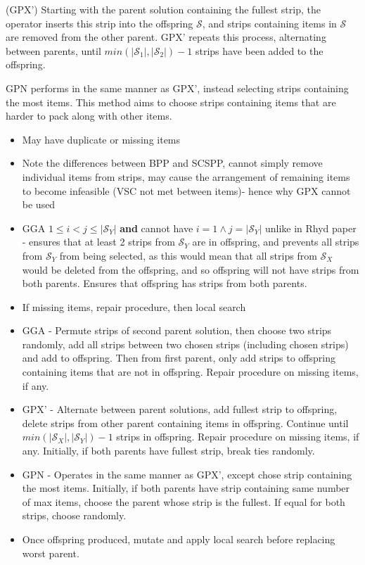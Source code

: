 \documentclass{elsarticle}
\begin{document}
(GPX') Starting with the parent solution containing the fullest strip, the operator inserts this strip into the offspring $\mathcal{S}$, and strips containing items in $\mathcal{S}$ are removed from the other parent. GPX' repeats this process, alternating between parents, until $min (|\mathcal{S}_1|,|\mathcal{S}_2|) - 1$ strips have been added to the offspring.

GPN performs in the same manner as GPX', instead selecting strips containing the most items. This method aims to choose strips containing items that are harder to pack along with other items.

\begin{itemize}
	\item May have duplicate or missing items
	\item Note the differences between BPP and SCSPP, cannot simply remove individual items from strips, may cause the arrangement of remaining items to become infeasible (VSC not met between items)- hence why GPX cannot be used \cite{lewis2017}
	\item GGA $1 \leq i < j \leq |\mathcal{S}_Y|$ \textbf{and} cannot have $i = 1 \land j = |\mathcal{S}_Y|$ unlike in Rhyd paper - ensures that at least 2 strips from $\mathcal{S}_Y$ are in offspring, and prevents all strips from $\mathcal{S}_Y$ from being selected, as this would mean that all strips from $\mathcal{S}_X$ would be deleted from the offspring, and so offspring will not have strips from both parents. Ensures that offspring has strips from both parents.
	\item If missing items, repair procedure, then local search
	\item GGA - Permute strips of second parent solution, then choose two strips randomly, add all strips between two chosen strips (including chosen strips) and add to offspring. Then from first parent, only add strips to offspring containing items that are not in offspring. Repair procedure on missing items, if any.
	\item GPX' - Alternate between parent solutions, add fullest strip to offspring, delete strips from other parent containing items in offspring. Continue until $min(|\mathcal{S}_X|,|\mathcal{S}_Y|)-1$ strips in offspring. Repair procedure on missing items, if any. Initially, if both parents have fullest strip, break ties randomly.
	\item GPN - Operates in the same manner as GPX', except chose strip containing the most items. Initially, if both parents have strip containing same number of max items, choose the parent whose strip is the fullest. If equal for both strips, choose randomly.
	\item Once offspring produced, mutate and apply local search before replacing worst parent.
\end{itemize}
\end{document}
